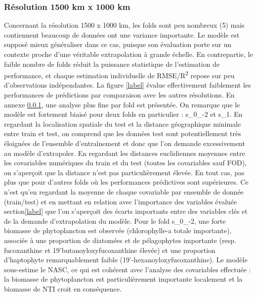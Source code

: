 \subsubsection{Résolution 1500 km x 1000 km}
Concernant la résolution 1500 x 1000 km, les folds sont peu nombreux (5) mais contiennent beaucoup de données ont une variance importante. Le modèle est supposé mieux généraliser dans ce cas, puisque son évaluation porte sur un contexte proche d'une véritable extrapolation à grande échelle. En contrepartie, le faible nombre de folds réduit la puissance statistique de l'estimation de performance, et chaque estimation individuelle de RMSE/R\textsuperscript{2} repose sur peu d'observations indépendantes. La figure \ref{label} évalue effectivement faiblement les performances de prédictions par comparaison avec les autres résolutions. En annexe \ref{}, une analyse plus fine par fold est présentée. On remarque que le modèle est fortement biaisé pour deux folds en particulier : s\_0\_-2 et s\_1. En regardant la localisation spatiale du test et la distance géographique minimale entre train et test, on comprend que les données test sont potentiellement très éloignées de l'ensemble d’entraînement et donc que l'on demande excessivement au modèle d'extrapoler. En regardant les distances euclidiennes moyennes entre les covariables numériques du train et du test (toutes les covariables sauf FOD), on s'aperçoit que la distance n'est pas particulièrement élevée. En tout cas, pas plus que pour d'autres folds où les performances prédictives sont supérieures. Ce n'est qu'en regardant la moyenne de chaque covariable par ensemble de donnée (train/test) et en mettant en relation avec l'importance des variables évaluée section\ref{label} que l'on s'aperçoit des écarts importants entre des variables clés et de la demande d'extrapolation du modèle. Pour le fold s\_0\_-2, une forte biomasse de phytoplancton est observée (chlorophylle-a totale importante), associée à une proportion de diatomées et de pélagophytes importante (resp. fucoxanthine et 19'butanoyloxyfucoxanthine élevée) et une proportion d'haptophyte remarquablement faible (19'-hexanoyloxyfucoxanthine). Le modèle sous-estime le NASC, ce qui est cohérent avec l'analyse des covariables effectuée : la biomasse de phytoplancton est particulièrement importante localement et la biomasse de NTI croit en conséquence. 

